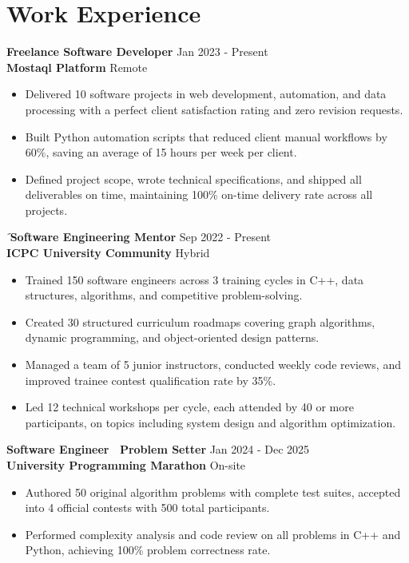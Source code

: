 \documentclass[letterpaper,10pt]{article}
\begin{document}
\section{Work Experience}

\textbf{Freelance Software Developer} \hfill Jan 2023 - Present\\
\textbf{Mostaql Platform} \hfill Remote
\begin{itemize}
  \item Delivered 10 software projects in web development, automation, and data processing with a perfect client satisfaction rating and zero revision requests.
  \item Built Python automation scripts that reduced client manual workflows by 60\%, saving an average of 15 hours per week per client.
  \item Defined project scope, wrote technical specifications, and shipped all deliverables on time, maintaining 100\% on-time delivery rate across all projects.
\end{itemize}
َ
\vspace{5pt}
\textbf{Software Engineering Mentor} \hfill Sep 2022 - Present\\
\textbf{ICPC University Community} \hfill Hybrid
\begin{itemize}
  \item Trained 150 software engineers across 3 training cycles in C++, data structures, algorithms, and competitive problem-solving.
  \item Created 30 structured curriculum roadmaps covering graph algorithms, dynamic programming, and object-oriented design patterns.
  \item Managed a team of 5 junior instructors, conducted weekly code reviews, and improved trainee contest qualification rate by 35\%.
  \item Led 12 technical workshops per cycle, each attended by 40 or more participants, on topics including system design and algorithm optimization.
\end{itemize}

\vspace{5pt}
\textbf{Software Engineer \textbar\ Problem Setter} \hfill Jan 2024 - Dec 2025\\
\textbf{University Programming Marathon} \hfill On-site
\begin{itemize}
  \item Authored 50 original algorithm problems with complete test suites, accepted into 4 official contests with 500 total participants.
  \item Performed complexity analysis and code review on all problems in C++ and Python, achieving 100\% problem correctness rate.
\end{itemize}
\end{document}
